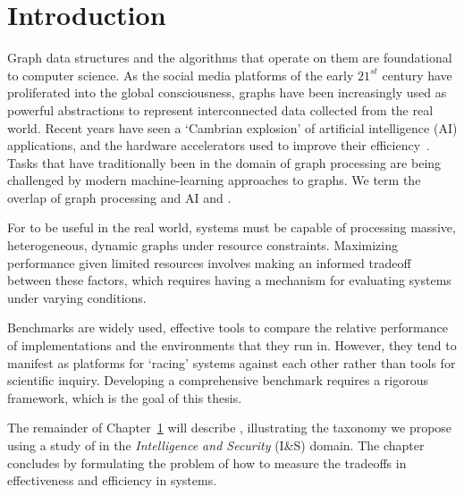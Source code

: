 \renewcommand{\thechapter}{1}
\chapter{Introduction}
\label{chapter:10-Introduction}
Graph data structures and the algorithms that operate on them are foundational to computer science.
As the social media platforms of the early $21^{st}$ century have proliferated into the global consciousness, graphs have been increasingly used as powerful abstractions to represent interconnected data collected from the real world. 
Recent years have seen a `Cambrian explosion' of artificial intelligence (AI) applications, and the hardware accelerators used to improve their efficiency~\cite{Regli2022b}.
Tasks that have traditionally been in the domain of graph processing are being challenged by modern machine-learning approaches to graphs.
We term the overlap of graph processing and AI and \gai.

For \gai to be useful in the real world, systems must be capable of processing massive, heterogeneous, dynamic graphs under resource constraints. 
Maximizing performance given limited resources involves making an informed tradeoff between these factors, which requires having a mechanism for evaluating \gai systems under varying conditions.


Benchmarks are widely used, effective tools to compare the relative performance of implementations and the environments that they run in. 
However, they tend to manifest as platforms for `racing' systems against each other rather than tools for scientific inquiry.
Developing a comprehensive benchmark requires a rigorous framework, which is the goal of this thesis.

The remainder of Chapter~\ref{chapter:10-Introduction} will describe \gai, illustrating the taxonomy we propose using a study of \gai in the \textit{Intelligence and Security} (I\&S) domain.
The chapter concludes by formulating the problem of how to measure the tradeoffs in effectiveness and efficiency in \gai systems.  

%


% 
% 
% 
